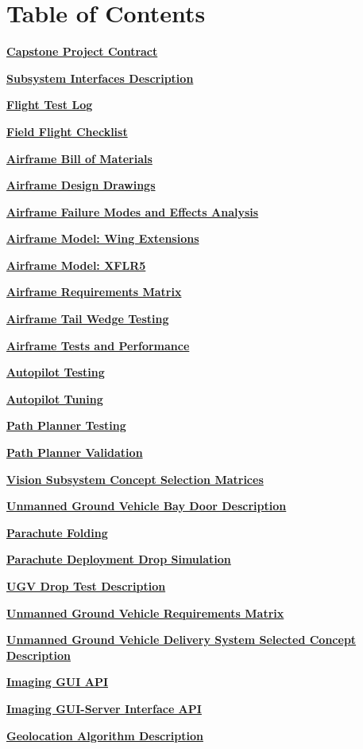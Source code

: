 \documentclass[]{article}
\newcommand{\pdflink}[2]{
\hyperlink{#1.1}{\textbf{#2}}
}
\begin{document}



\section*{Table of Contents}

\pdflink{proj_cont}{Capstone Project Contract}

\pdflink{sid}{Subsystem Interfaces Description}

\pdflink{fl}{Flight Test Log}

\pdflink{ffcl}{Field Flight Checklist}

\pdflink{abm}{Airframe Bill of Materials}

\pdflink{add}{Airframe Design Drawings}

\pdflink{afmea}{Airframe Failure Modes and Effects Analysis}

\pdflink{amwe}{Airframe Model: Wing Extensions}

\pdflink{amxflr}{Airframe Model: XFLR5}

\pdflink{arq}{Airframe Requirements Matrix}

\pdflink{atwt}{Airframe Tail Wedge Testing}

\pdflink{atap}{Airframe Tests and Performance}

\pdflink{atest}{Autopilot Testing}

\pdflink{atune}{Autopilot Tuning}

\pdflink{ppt}{Path Planner Testing}

\pdflink{ppv}{Path Planner Validation}

\pdflink{udd}{Vision Subsystem Concept Selection Matrices}

\pdflink{ugvbdd}{Unmanned Ground Vehicle Bay Door Description}

\pdflink{pf}{Parachute Folding}

\pdflink{pdds}{Parachute Deployment Drop Simulation}

\pdflink{udtd}{UGV Drop Test Description}

\pdflink{ugvrm}{Unmanned Ground Vehicle Requirements Matrix}

\pdflink{ugvdsscd}{Unmanned Ground Vehicle Delivery System Selected Concept Description}

\pdflink{iga}{Imaging GUI API}

\pdflink{igsia}{Imaging GUI-Server Interface API}

\pdflink{gad}{Geolocation Algorithm Description}
\end{document}
